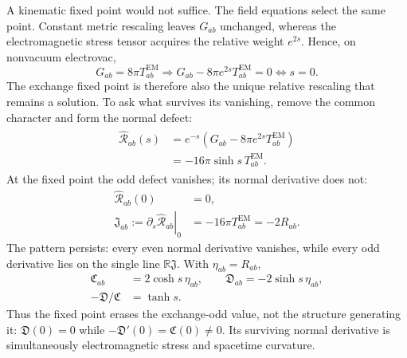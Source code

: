 \documentclass[aps,prl,reprint]{revtex4-2}
\newcommand{\EM}{\mathrm{EM}}
\begin{document}
A kinematic fixed point would not suffice. The field equations select the same point. Constant metric rescaling leaves $G_{ab}$ unchanged, whereas the electromagnetic stress tensor acquires the relative weight $e^{2s}$. Hence, on nonvacuum electrovac,
\begin{equation}
G_{ab}=8\pi T^{\EM}_{ab}
\Longrightarrow
G_{ab}-8\pi e^{2s}T^{\EM}_{ab}=0
\iff s=0 .
\label{eq:fixed}
\end{equation}
The exchange fixed point is therefore also the unique relative rescaling that remains a solution. To ask what survives its vanishing, remove the common character and form the normal defect:
\begin{align}
\begin{aligned}
\widehat{\mathcal R}_{ab}(s)
&=e^{-s}\!\left(G_{ab}-8\pi e^{2s}T^{\EM}_{ab}\right)\\
&=-16\pi\sinh s\,T^{\EM}_{ab} .
\end{aligned}
\label{eq:defect}
\end{align}
At the fixed point the odd defect vanishes; its normal derivative does not:
\begin{equation}
\begin{aligned}
\widehat{\mathcal R}_{ab}(0)&=0,\\
\mathfrak J_{ab}
:=\left.\partial_s\widehat{\mathcal R}_{ab}\right|_0
&=-16\pi T^{\EM}_{ab}=-2R_{ab}.
\end{aligned}
\label{eq:jet}
\end{equation}
The pattern persists: every even normal derivative vanishes, while every odd derivative lies on the single line $\mathbb R\mathfrak J$. With $\eta_{ab}=R_{ab}$,
\begin{equation}
\begin{aligned}
\mathfrak C_{ab}&=2\cosh s\,\eta_{ab},\qquad
\mathfrak D_{ab}=-2\sinh s\,\eta_{ab},\\
-\mathfrak D/\mathfrak C&=\tanh s .
\end{aligned}
\label{eq:evenodd}
\end{equation}
Thus the fixed point erases the exchange-odd value, not the structure generating it: $\mathfrak D(0)=0$ while $-\mathfrak D'(0)=\mathfrak C(0)\neq0$. Its surviving normal derivative is simultaneously electromagnetic stress and spacetime curvature.
\end{document}
